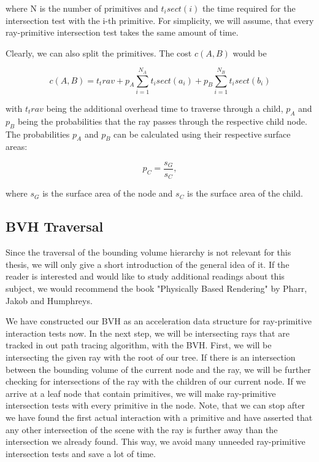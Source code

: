 where N is the number of primitives and $t_isect(i)$ the time required for the intersection test with the i-th primitive. For simplicity, we will assume, that every ray-primitive intersection test takes the same amount of time.

Clearly, we can also split the primitives. The cost $c(A,B)$ would be

\begin{equation}
c(A,B) = t_trav + p_A\sum_{i=1}^{N_A}t_isect(a_i) + p_B\sum_{i=1}^{N_B}t_isect(b_i)
\end{equation}

with $t_trav$ being the additional overhead time to traverse through a child, $p_A$ and $p_B$ being the probabilities that the ray passes through the respective child node. The probabilities $p_A$ and $p_B$ can be calculated using their respective surface areas:

\begin{equation}
p_C = \frac{s_G}{s_C},
\end{equation}

where $s_G$ is the surface area of the node and $s_C$ is the surface area of the child.

\subsection{BVH Traversal}

Since the traversal of the bounding volume hierarchy is not relevant for this thesis, we will only give a short introduction of the general idea of it. If the reader is interested and would like to study additional readings about this subject, we would recommend the book "Physically Based Rendering" by Pharr, Jakob and Humphreys. \Cite{PBR}

We have constructed our BVH as an acceleration data structure for ray-primitive interaction tests now. In the next step, we will be intersecting rays that are tracked in out path tracing algorithm, with the BVH. First, we will be intersecting the given ray with the root of our tree. If there is an intersection between the bounding volume of the current node and the ray, we will be further checking for intersections of the ray with the children of our current node. If we arrive at a leaf node that contain primitives, we will make ray-primitive intersection tests with every primitive in the node. Note, that we can stop after we have found the first actual interaction with a primitive and have asserted that any other intersection of the scene with the ray is further away than the intersection we already found.  This way, we avoid many unneeded ray-primitive intersection tests 
and save a lot of time.

